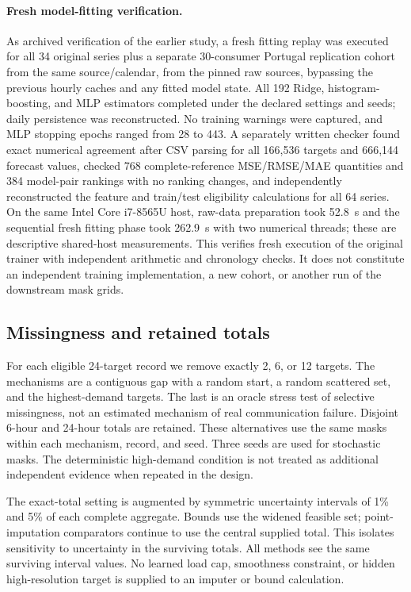 \paragraph{Fresh model-fitting verification.}
As archived verification of the earlier study, a fresh fitting replay was executed for all 34 original series plus a separate 30-consumer Portugal replication cohort from the same source/calendar, from the pinned raw sources, bypassing the previous hourly caches and any fitted model state. All 192 Ridge, histogram-boosting, and MLP estimators completed under the declared settings and seeds; daily persistence was reconstructed. No training warnings were captured, and MLP stopping epochs ranged from 28 to 443. A separately written checker found exact numerical agreement after CSV parsing for all 166,536 targets and 666,144 forecast values, checked 768 complete-reference MSE/RMSE/MAE quantities and 384 model-pair rankings with no ranking changes, and independently reconstructed the feature and train/test eligibility calculations for all 64 series. On the same Intel Core i7-8565U host, raw-data preparation took 52.8~s and the sequential fresh fitting phase took 262.9~s with two numerical threads; these are descriptive shared-host measurements. This verifies fresh execution of the original trainer with independent arithmetic and chronology checks. It does not constitute an independent training implementation, a new cohort, or another run of the downstream mask grids.

\subsection{Missingness and retained totals}
For each eligible 24-target record we remove exactly 2, 6, or 12 targets.
The mechanisms are a contiguous gap with a random start, a random scattered
set, and the highest-demand targets. The last is an oracle stress test of
selective missingness, not an estimated mechanism of real communication
failure. Disjoint 6-hour and 24-hour totals are retained. These alternatives
use the same masks within each mechanism, record, and seed. Three seeds
are used for stochastic masks. The deterministic high-demand condition is
not treated as additional independent evidence when repeated in the design.

The exact-total setting is augmented by symmetric uncertainty intervals of
1\% and 5\% of each complete aggregate. Bounds use the widened feasible
set; point-imputation comparators continue to use the central supplied
total. This isolates sensitivity to uncertainty in the surviving totals.
All methods see the same surviving interval values. No learned load cap,
smoothness constraint, or hidden high-resolution target is supplied to an
imputer or bound calculation.

